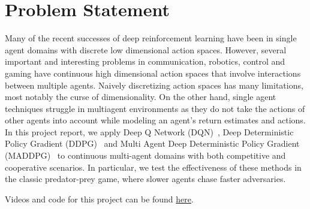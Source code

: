 
\section{Problem Statement}
\label{sec:problem}

Many of the recent successes of deep reinforcement learning have been in
single agent domains with discrete low dimensional action spaces. However, 
several important and interesting problems in communication, robotics, control
and gaming have continuous high dimensional action spaces that involve interactions
between multiple agents. Naively discretizing action spaces has many limitations,
most notably the curse of dimensionality. On the other hand, single agent techniques
struggle in multiagent environments as they do not take the actions of other agents
into account while modeling an agent's return estimates and actions. In this project
report, we apply Deep Q Network (DQN)~\cite{mnih2016dqn}, Deep Deterministic Policy Gradient (DDPG)~\cite{lillicrap2016continuous} and Multi Agent Deep Deterministic Policy Gradient (MADDPG)~\cite{lowe2017multi} to continuous multi-agent
domains with both competitive and cooperative scenarios. In particular, we test the 
effectiveness of these methods in the classic predator-prey game, where slower agents 
chase faster adversaries.

Videos and code for this project can be found \href{https://github.com/camellyx/10707-deep-learning-project}{here}.
 
